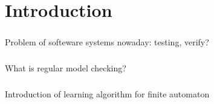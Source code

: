 
\chapter{Introduction}\label{chapter:introduction}
\paragraph{}
Problem of softeware systems nowaday: testing, verify?

\paragraph{}
What is regular model checking?

\paragraph{}
Introduction of learning algorithm for finite automaton